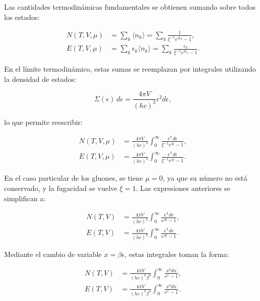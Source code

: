 Las cantidades termodinámicas fundamentales se obtienen sumando sobre todos los estados:

\begin{align}
N(T,V,\mu) &= \sum_k \langle n_k \rangle = \sum_k \frac{1}{\xi^{-1} e^{\beta \epsilon_k} - 1}, \label{eq-BE-Ntotal} \\
E(T,V,\mu) &= \sum_k \epsilon_k \langle n_k \rangle = \sum_k \frac{\epsilon_k}{\xi^{-1} e^{\beta \epsilon_k} - 1}. \label{eq-BE-Etotal}
\end{align}

\break

En el límite termodinámico, estas sumas se reemplazan por integrales utilizando la densidad de estados:

\begin{equation}
\Sigma(\epsilon) \, d\epsilon = \frac{4\pi V}{(hc)^3} \epsilon^2 d\epsilon,
\end{equation}

lo que permite reescribir:

\begin{align}
N(T,V,\mu) &= \frac{4\pi V}{(hc)^3} \int_0^\infty \frac{\epsilon^2 \, d\epsilon}{\xi^{-1} e^{\beta \epsilon} - 1}, \label{eq-BE-Ntotalint} \\
E(T,V,\mu) &= \frac{4\pi V}{(hc)^3} \int_0^\infty \frac{\epsilon^3 \, d\epsilon}{\xi^{-1} e^{\beta \epsilon} - 1}. \label{eq-BE-Etotalint}
\end{align}

En el caso particular de los gluones, se tiene \( \mu = 0 \), ya que su número no está conservado, y la fugacidad se vuelve \( \xi = 1 \). Las expresiones anteriores se simplifican a:

\begin{align}
N(T,V) &= \frac{4\pi V}{(hc)^3} \int_0^\infty \frac{\epsilon^2 \, d\epsilon}{e^{\beta \epsilon} - 1}, \label{eq-BE-Ntotalintnofug} \\
E(T,V) &= \frac{4\pi V}{(hc)^3} \int_0^\infty \frac{\epsilon^3 \, d\epsilon}{e^{\beta \epsilon} - 1}. \label{eq-BE-Etotalintnofug}
\end{align}

Mediante el cambio de variable \( x = \beta \epsilon \), estas integrales toman la forma:

\begin{align}
N(T,V) &= \frac{4\pi V}{(hc)^3 \beta^3} \int_0^\infty \frac{x^2 dx}{e^x - 1}, \label{eq-BE-Ntotalintnofug-x} \\
E(T,V) &= \frac{4\pi V}{(hc)^3 \beta^4} \int_0^\infty \frac{x^3 dx}{e^x - 1}. \label{eq-BE-Etotalintnofug-x}
\end{align}

